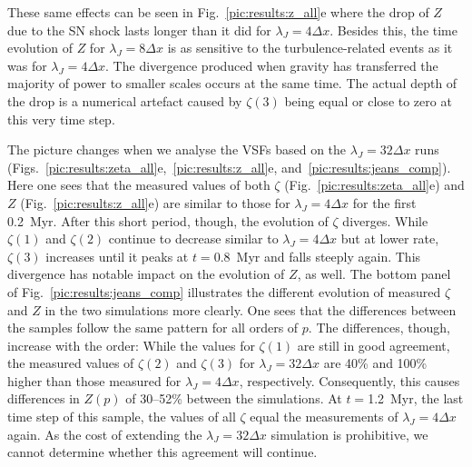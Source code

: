 \documentclass{aa}		%
\begin{document}
These same effects can be seen in Fig.~\ref{pic:results:z_all}e where the drop of $Z$ due to the SN shock lasts longer than it did for $\lambda_J = 4\Delta{}x$. 
Besides this, the time evolution of $Z$ for $\lambda_J = 8\Delta{}x$ is as sensitive to the turbulence-related events as it was for $\lambda_J = 4\Delta{}x$.
The divergence produced when gravity has transferred the majority of power to smaller scales occurs at the same time. 
The actual depth of the drop is a numerical artefact caused by $\zeta(3)$ being equal or close to zero at this very time step. 

The picture changes when we analyse the VSFs based on the $\lambda_J = 32\Delta{}x$ runs (Figs.~\ref{pic:results:zeta_all}e,~\ref{pic:results:z_all}e, and~\ref{pic:results:jeans_comp}).
Here one sees that the measured values of both $\zeta$ (Fig.~\ref{pic:results:zeta_all}e) and $Z$ (Fig.~\ref{pic:results:z_all}e) are similar to those for $\lambda_J = 4\Delta{}x$ for the first 0.2~Myr.
After this short period, though, the evolution of $\zeta$ diverges. 
While $\zeta(1)$ and $\zeta(2)$ continue to decrease similar to $\lambda_J = 4\Delta{}x$ but at lower rate, $\zeta(3)$ increases until it peaks at $t=0.8$~Myr and falls steeply again.
This divergence has notable impact on the evolution of $Z$, as well. 
The bottom panel of Fig.~\ref{pic:results:jeans_comp} illustrates the different evolution of measured $\zeta$ and $Z$ in the two simulations more clearly.
One sees that the differences between the samples follow the same pattern for all orders of $p$.
The differences, though, increase with the order:
While the values for $\zeta(1)$ are still in good agreement, the measured values of $\zeta(2)$ and $\zeta(3)$ for $\lambda_J = 32\Delta{}x$ are 40\% and 100\% higher than those measured for $\lambda_J = 4\Delta{}x$, respectively.
Consequently, this causes differences in $Z(p)$ of 30--52\% between the simulations.
At $t=$1.2~Myr, the last time step of this sample, the values of all $\zeta$ equal the measurements of $\lambda_J = 4\Delta{}x$ again.
As the cost of extending the $\lambda_J = 32\Delta{}x$ simulation is prohibitive, we cannot determine whether this agreement will continue.
\end{document}
